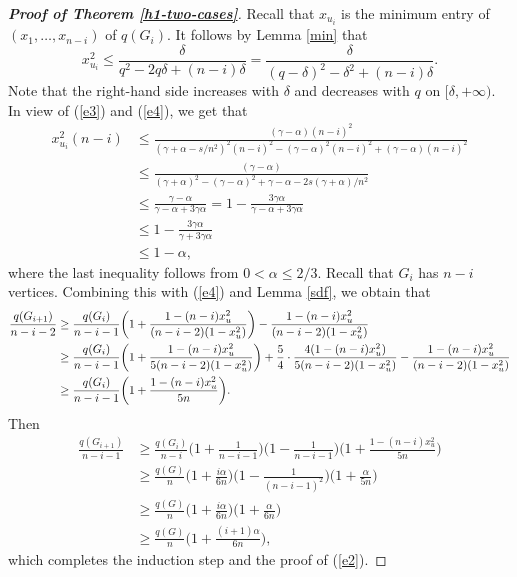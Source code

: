 \documentclass[11pt,a4paper]{article}
\theoremstyle{plain}
\theoremstyle{definition}
\begin{document}
\begin{proof}[{\bf Proof of Theorem \ref{h1-two-cases}}]
 Recall that $x_{u_i}$ is the minimum entry of $(x_1,\ldots ,x_{n-i})$ of $q(G_i)$.  
 It follows by Lemma \ref{min} that
 $$x_{u_{i}}^{2}\leq \frac{\delta}{q^{2}-2q\delta+(n-i)\delta}=\frac{\delta}{(q-\delta)^{2}-\delta^{2}+(n-i)\delta}.$$
Note that the right-hand side increases with $\delta$ and decreases with $q$ on $[\delta,+\infty)$.
In view of (\ref{e3}) and (\ref{e4}), we get that
\begin{displaymath}
\begin{split}
x_{{u}_{i}}^{2}(n-i)
&\leq \frac{(\gamma-\alpha)(n-i)^{2}}{(\gamma+\alpha-s/n^{2})^{2}(n-i)^{2}
-(\gamma-\alpha)^{2}(n-i)^{2}+(\gamma-\alpha)(n-i)^{2}}\\
&\leq \frac{(\gamma-\alpha)}{(\gamma+\alpha)^{2}-(\gamma-\alpha)^{2}+\gamma-\alpha
-2s(\gamma+\alpha)/n^{2}}\\
&\leq \frac{\gamma -\alpha}{\gamma-\alpha
+3\gamma \alpha}
= 1- \frac{3\gamma \alpha}{\gamma-\alpha
+3\gamma \alpha}\\
&\leq 1- \frac{3\gamma \alpha}{\gamma
+3\gamma \alpha}\\
&\leq  1-\alpha,
\end{split}
\end{displaymath}
where the last inequality follows from $0<\alpha\leq2/3$. 
Recall that $G_i$ has $n-i$ vertices. 
Combining this with  (\ref{e4}) and Lemma \ref{sdf}, we obtain that   
\begin{align*} \notag
\frac{q(G_{i+1})}{n-i-2}&\ge \frac{q(G_i)}{n-i-1}\bigg(1+\frac{1-(n-i)x_u^{2}}{(n-i-2)(1-x_u^{2})}\bigg)-\frac{1-(n-i)x_u^{2}}{(n-i-2)(1-x_u^{2})}\\ 
\notag 
&\geq \frac{q(G_i)}{n-i-1}\bigg(1+\frac{1-(n-i)x_u^{2}}{5(n-i-2)(1-x_u^{2})}\bigg)+\frac{5}{4}\cdot \frac{4(1-(n-i)x_u^{2})}{5(n-i-2)(1-x_u^{2})}-\frac{1-(n-i)x_u^{2}}{(n-i-2)(1-x_u^{2})}\\ 
\notag 
&\geq \frac{q(G_i)}{n-i-1}\bigg(1+\frac{1-(n-i)x_u^{2}}{5n}\bigg).
\end{align*} 
Then 
\begin{displaymath}
\begin{split}
\frac{q(G_{i+1})}{n-i-1}&\geq\frac{q(G_{i})}{n-i}\bigg(1+\frac{1}{n-i-1}\bigg)\bigg(1-\frac{1}{n-i-1}\bigg)\bigg(1+\frac{1-(n-i)x_{u}^{2}}{5n}\bigg)\\
&\geq \frac{q(G)}{n}\bigg(1+\frac{i \alpha}{6n}\bigg)\bigg(1-\frac{1}{(n-i-1)^{2}}\bigg)\bigg(1+\frac{\alpha}{5n}\bigg)\\
&\geq \frac{q(G)}{n}\bigg(1+\frac{i \alpha}{6n}\bigg)\bigg(1+\frac{\alpha}{6n}\bigg)\\
&\geq \frac{q(G)}{n}\bigg(1+\frac{(i+1)\alpha}{6n}\bigg),
 \end{split}
\end{displaymath} 
which completes the induction step and the proof of (\ref{e2}).


\end{proof}
\end{document}
